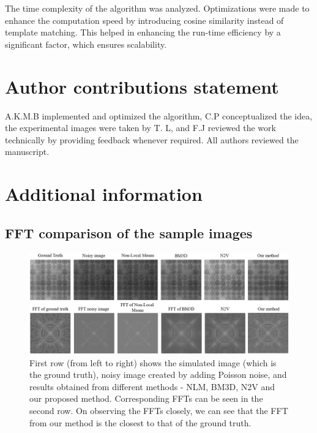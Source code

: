 \documentclass[fleqn,10pt]{wlscirep}
\begin{document}
	The time complexity of the algorithm was analyzed. Optimizations were made to enhance the computation speed by introducing cosine similarity instead of template matching. This helped in enhancing the run-time efficiency by a significant factor, which ensures scalability.
	
	

	
	
	\section*{Author contributions statement}
	
	A.K.M.B implemented and optimized the algorithm, C.P conceptualized the idea, the experimental images were taken by T. L, and F.J reviewed the work technically by providing feedback whenever required.  All authors reviewed the manuscript. 
	
	\section*{Additional information}
	
	\subsection*{FFT comparison of the sample images}
	\label{fftcomparison}
	
	\begin{figure}[H]
		\centering
		\includegraphics[scale=0.6]{./imgs/comparison-sample_fft.jpg}
		\caption{First row (from left to right) shows the simulated image (which is the ground truth), noisy image created by adding Poisson noise, and  results obtained from different methods - NLM, BM3D, N2V and our proposed method. Corresponding FFTs can be seen in the second row. On observing the FFTs closely, we can see that the FFT from our method is the closest to that of the ground truth.}
		\label{fig:comparison_sample_fft}
	\end{figure}
\end{document}
